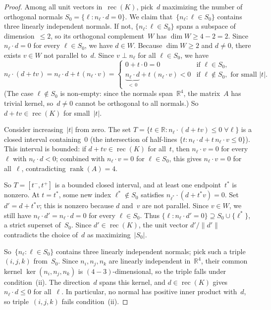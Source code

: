 \begin{proof}
Among all unit vectors in~$\operatorname{rec}(K)$, pick~$d$ maximizing the
number of orthogonal normals $S_0 = \{\ell : n_\ell \cdot d = 0\}$.  We claim
that~$\{n_\ell : \ell \in S_0\}$ contains three linearly independent normals.
If not, $\{n_\ell : \ell \in S_0\}$ spans a subspace of dimension~$\le 2$,
so its orthogonal complement~$W$ has $\dim W \ge 4 - 2 = 2$.  Since
$n_\ell \cdot d = 0$ for every $\ell \in S_0$, we have $d \in W$.  Because
$\dim W \ge 2$ and $d \ne 0$, there exists $v \in W$ not parallel to~$d$.
Since $v \perp n_\ell$ for all $\ell \in S_0$, we have
\[
  n_\ell \cdot (d + tv) = n_\ell \cdot d + t\,(n_\ell \cdot v)
  = \begin{cases}
    0 + t \cdot 0 = 0 & \text{if } \ell \in S_0, \\
    \underbrace{n_\ell \cdot d}_{<\,0} + t\,(n_\ell \cdot v) < 0
    & \text{if } \ell \notin S_0, \text{ for small } |t|.
  \end{cases}
\]
(The case $\ell \notin S_0$ is non-empty: since the normals span~$\mathbb{R}^4$,
the matrix~$A$ has trivial kernel, so~$d \ne 0$ cannot be orthogonal to all
normals.)
So $d + tv \in \operatorname{rec}(K)$ for small~$|t|$.

Consider increasing~$|t|$ from zero.  The set
$T = \{t \in \mathbb{R} : n_\ell \cdot (d + tv) \le 0 \;\forall \ell\}$ is
a closed interval containing~$0$ (the intersection of half-lines
$\{t : n_\ell \cdot d + t\,n_\ell \cdot v \le 0\}$).  This interval is
bounded: if $d + tv \in \operatorname{rec}(K)$ for all~$t$, then
$n_\ell \cdot v = 0$ for every~$\ell$ with $n_\ell \cdot d < 0$; combined
with $n_\ell \cdot v = 0$ for $\ell \in S_0$, this gives $n_\ell \cdot v = 0$
for all~$\ell$, contradicting $\operatorname{rank}(A) = 4$.

So $T = [t^-, t^+]$ is a bounded closed interval, and at least one
endpoint~$t^*$ is nonzero.  At $t = t^*$, some new index
$\ell^* \notin S_0$ satisfies $n_{\ell^*} \cdot (d + t^* v) = 0$.  Set
$d' = d + t^* v$; this is nonzero because $d$ and~$v$ are not parallel.
Since $v \in W$, we still have $n_\ell \cdot d' = n_\ell \cdot d = 0$
for every $\ell \in S_0$.  Thus
$\{\ell : n_\ell \cdot d' = 0\} \supseteq S_0 \cup \{\ell^*\}$,
a strict superset of~$S_0$.  Since $d' \in \operatorname{rec}(K)$, the unit
vector $d' / \|d'\|$ contradicts the choice of~$d$ as maximizing~$|S_0|$.

So~$\{n_\ell : \ell \in S_0\}$ contains three linearly independent normals;
pick such a triple~$(i,j,k)$ from~$S_0$.  Since $n_i, n_j, n_k$ are linearly
independent in~$\mathbb{R}^4$, their common kernel $\ker(n_i, n_j, n_k)$ is
$(4 - 3)$-dimensional, so the triple falls under condition~\textup{(ii)}.
The direction~$d$ spans this kernel, and $d \in \operatorname{rec}(K)$ gives
$n_\ell \cdot d \le 0$ for all~$\ell$.  In particular, no normal has positive
inner product with~$d$, so triple~$(i,j,k)$ fails condition~\textup{(ii)}.
\end{proof}

